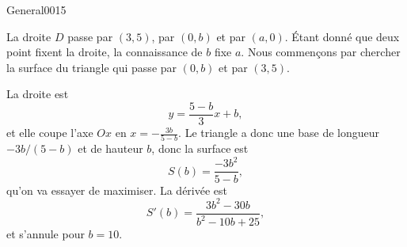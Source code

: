 \begin{corrige}{General0015}

La droite $D$ passe par $(3,5)$, par $(0,b)$ et par $(a,0)$. Étant donné que deux point fixent la droite, la connaissance de $b$ fixe $a$. Nous commençons par chercher la surface du triangle qui passe par $(0,b)$ et par $(3,5)$.

La droite est
\begin{equation}
	y=\frac{ 5-b }{ 3 }x+b,
\end{equation}
et elle coupe l'axe $Ox$ en $x=-\frac{ 3b }{ 5-b }$. Le triangle a donc une base de longueur $-3b/(5-b)$ et de hauteur $b$, donc la surface est
\begin{equation}
	S(b)=\frac{ -3b^2 }{ 5-b },
\end{equation}
qu'on va essayer de maximiser. La dérivée est
\begin{equation}
	S'(b)=\frac{ 3b^2-30b }{ b^2-10b+25 },
\end{equation}
et s'annule pour $b=10$.

\end{corrige}
